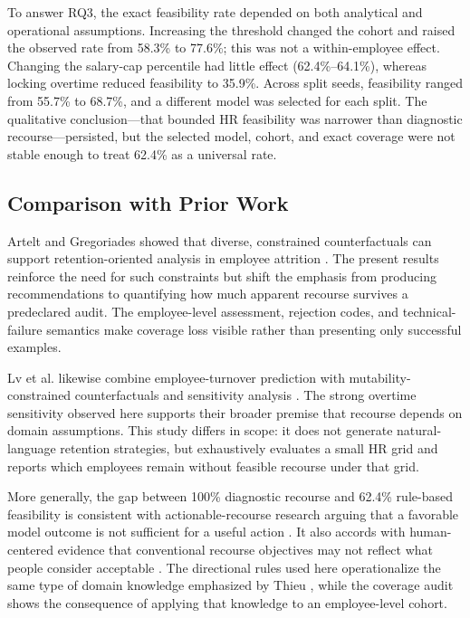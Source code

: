 \documentclass[11pt]{article}
\begin{document}
To answer RQ3, the exact feasibility rate depended on both analytical and operational assumptions. Increasing the threshold changed the cohort and raised the observed rate from 58.3\% to 77.6\%; this was not a within-employee effect. Changing the salary-cap percentile had little effect (62.4\%--64.1\%), whereas locking overtime reduced feasibility to 35.9\%. Across split seeds, feasibility ranged from 55.7\% to 68.7\%, and a different model was selected for each split. The qualitative conclusion---that bounded HR feasibility was narrower than diagnostic recourse---persisted, but the selected model, cohort, and exact coverage were not stable enough to treat 62.4\% as a universal rate.

\subsection{Comparison with Prior Work}
Artelt and Gregoriades showed that diverse, constrained counterfactuals can support retention-oriented analysis in employee attrition \cite{artelt2023}. The present results reinforce the need for such constraints but shift the emphasis from producing recommendations to quantifying how much apparent recourse survives a predeclared audit. The employee-level assessment, rejection codes, and technical-failure semantics make coverage loss visible rather than presenting only successful examples.

Lv et al. likewise combine employee-turnover prediction with mutability-constrained counterfactuals and sensitivity analysis \cite{lv2026}. The strong overtime sensitivity observed here supports their broader premise that recourse depends on domain assumptions. This study differs in scope: it does not generate natural-language retention strategies, but exhaustively evaluates a small HR grid and reports which employees remain without feasible recourse under that grid.

More generally, the gap between 100\% diagnostic recourse and 62.4\% rule-based feasibility is consistent with actionable-recourse research arguing that a favorable model outcome is not sufficient for a useful action \cite{ustun2019,poyiadzi2020,karimi2022}. It also accords with human-centered evidence that conventional recourse objectives may not reflect what people consider acceptable \cite{tominaga2024}. The directional rules used here operationalize the same type of domain knowledge emphasized by Thieu \cite{thieu2026}, while the coverage audit shows the consequence of applying that knowledge to an employee-level cohort.
\end{document}
